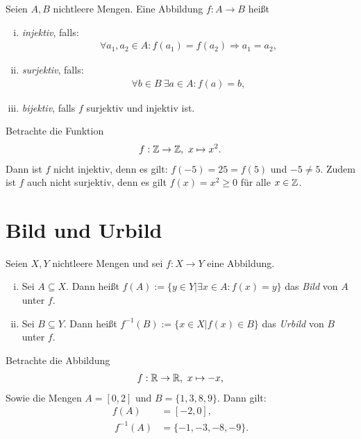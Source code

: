 \begin{mydef}
    Seien $A,B$ nichtleere Mengen. Eine Abbildung $f:A \to B$ heißt
    \begin{enumerate}[(i)]
        \item
        \textit{injektiv}, falls: 
        \begin{align*}
            \forall a_1,a_2 \in A: f(a_1)=f(a_2) \Rightarrow a_1 = a_2, 
        \end{align*}
        \item 
        \textit{surjektiv}, falls: 
        \begin{align*}
            \forall b \in B \ \exists a \in A: f(a) = b,
        \end{align*}
        \item 
        \textit{bijektiv}, falls $f$ surjektiv und injektiv ist. 
    \end{enumerate}
\end{mydef}

\begin{example}
    Betrachte die Funktion 
    \begin{align*}
        f: \mathbb{Z} \to \mathbb{Z}, \ x \mapsto x^2.
    \end{align*}
    Dann ist $f$ nicht injektiv, denn es gilt: $f(-5) = 25 = f(5)$ und $-5 \neq 5$. Zudem ist $f$ auch nicht surjektiv, denn es gilt $f(x) = x^2 \geq 0$ für alle $x \in \mathbb{Z}$. 
\end{example}

\section{Bild und Urbild} 

\begin{mydef}
    Seien $X,Y$ nichtleere Mengen und sei $f:X \to Y$ eine Abbildung. 
    \begin{enumerate}[(i)]
        \item 
        Sei $A \subseteq X$. Dann heißt $f(A):=\{y \in Y | \exists x \in A : f(x) = y \}$ das \textit{Bild} von $A$ unter $f$. 
        \item 
        Sei $B \subseteq Y$. Dann heißt $f^{-1}(B):=\{x \in X | f(x) \in B \}$ das \textit{Urbild} von $B$ unter $f$. 
    \end{enumerate}
\end{mydef}

\begin{example}
    Betrachte die Abbildung 
    \begin{align*}
        f: \mathbb{R} \to \mathbb{R}, \ x \mapsto -x,
    \end{align*}
    Sowie die Mengen $A = [0,2]$ und $B = \{1,3,8,9\}$. Dann gilt: 
    \begin{align*}
        f(A) &= [-2,0], \\\
        f^{-1}(A) &= \{-1, -3,-8,-9\}. 
    \end{align*}
\end{example}

